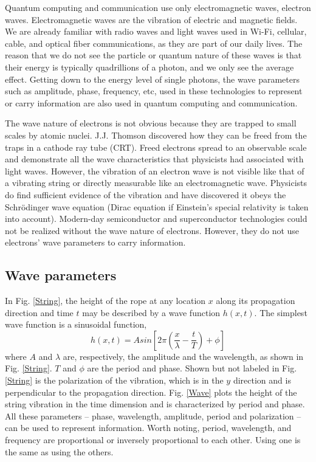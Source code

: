 \documentclass[oneside, letter, 12pt]{book}
\begin{document}
Quantum computing and communication use only electromagnetic waves, electron waves. Electromagnetic waves are the vibration of electric and magnetic fields. We are already familiar with radio waves and light waves used in Wi-Fi, cellular, cable, and optical fiber communications, as they are part of our daily lives. The reason that we do not see the particle or quantum nature of these waves is that their energy is typically quadrillions of a photon, and we only see the average effect. Getting down to the energy level of single photons, the wave parameters such as amplitude, phase, frequency, etc, used in these technologies to represent or carry information are also used in quantum computing and communication.

The wave nature of electrons is not obvious because they are trapped to small scales by atomic nuclei. J.J. Thomson discovered how they can be freed from the traps\cite{THOMSON} in a cathode ray tube (CRT). Freed electrons spread to an observable scale and demonstrate all the wave characteristics that physicists had associated with light waves. However, the vibration of an electron wave is not visible like that of a vibrating string or directly measurable like an electromagnetic wave. Physicists do find sufficient evidence of the vibration and have discovered it obeys the Schrödinger wave equation (Dirac equation if Einstein's special relativity is taken into account). Modern-day semiconductor and superconductor technologies could not be realized without the wave nature of electrons. However, they do not use electrons' wave parameters to carry information.

\subsection{Wave parameters}
In Fig. \ref{String}, the height of the rope at any location $x$ along its propagation direction and time $t$ may be described by a wave function $h(x,t)$. The simplest wave function is a sinusoidal function,
\begin{equation}\label{e-hWave1}
    h(x,t) = A sin[2\pi (\frac x \lambda - \frac t T) +\phi]
\end{equation}
where $A$ and $\lambda$ are, respectively, the amplitude and the wavelength, as shown in Fig. \ref{String}. $T$ and $\phi$ are the period and phase. Shown but not labeled in Fig. \ref{String} is the polarization of the vibration, which is in the $y$ direction and is perpendicular to the propagation direction. Fig. \ref{Wave} plots the height of the string vibration in the time dimension and is characterized by period and phase. All these parameters -- phase, wavelength, amplitude, period and polarization -- can be used to represent information. Worth noting, period, wavelength, and frequency are proportional or inversely proportional to each other. Using one is the same as using the others.
\end{document}
